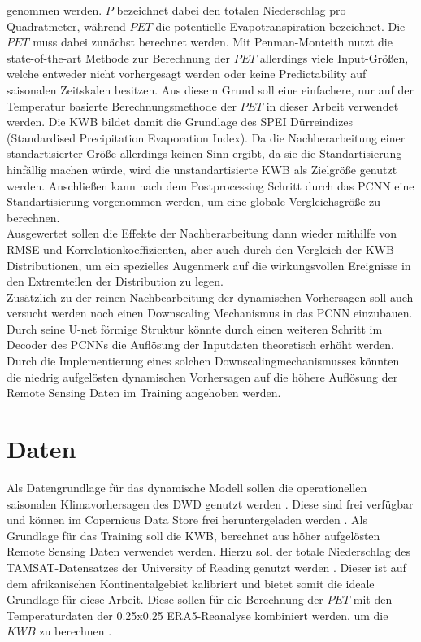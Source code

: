 \documentclass[ba-expose-lentz.tex]{subfile}
\begin{document}
genommen werden. $P$ bezeichnet dabei den totalen Niederschlag pro Quadratmeter, während $PET$ die potentielle Evapotranspiration bezeichnet.
Die $PET$ muss dabei zunächst berechnet werden.
Mit Penman-Monteith nutzt die state-of-the-art Methode zur Berechnung der $PET$ allerdings viele Input-Größen, welche entweder nicht vorhergesagt werden oder keine Predictability auf saisonalen Zeitskalen besitzen.
Aus diesem Grund soll eine einfachere, nur auf der Temperatur basierte Berechnungsmethode der $PET$ in dieser Arbeit verwendet werden.
Die KWB bildet damit die Grundlage des SPEI Dürreindizes (Standardised Precipitation Evaporation Index).
Da die Nachberarbeitung einer standartisierter Größe allerdings keinen Sinn ergibt, da sie die Standartisierung hinfällig machen würde, wird die unstandartisierte KWB als Zielgröße genutzt werden.
Anschließen kann nach dem Postprocessing Schritt durch das PCNN eine Standartisierung vorgenommen werden, um eine globale Vergleichsgröße zu berechnen. \\
Ausgewertet sollen die Effekte der Nachberarbeitung dann wieder mithilfe von RMSE und Korrelationkoeffizienten, aber auch durch den Vergleich der KWB Distributionen, um ein spezielles Augenmerk auf die wirkungsvollen Ereignisse in den Extremteilen der Distribution zu legen. \\
Zusätzlich zu der reinen Nachbearbeitung der dynamischen Vorhersagen soll auch versucht werden noch einen Downscaling Mechanismus in das PCNN einzubauen.
Durch seine U-net förmige Struktur könnte durch einen weiteren Schritt im Decoder des PCNNs die Auflösung der Inputdaten theoretisch erhöht werden.
Durch die Implementierung eines solchen Downscalingmechanismusses könnten die niedrig aufgelösten dynamischen Vorhersagen auf die höhere Auflösung der Remote Sensing Daten im Training angehoben werden.

\section{Daten}

Als Datengrundlage für das dynamische Modell sollen die operationellen saisonalen Klimavorhersagen des DWD genutzt werden \parencite{paxian_dwd_2023}.
Diese sind frei verfügbar und können im Copernicus Data Store frei heruntergeladen werden \parencite{paxian_dwd_2023}.
Als Grundlage für das Training soll die KWB, berechnet aus höher aufgelösten Remote Sensing Daten verwendet werden.
Hierzu soll der totale Niederschlag des TAMSAT-Datensatzes der University of Reading genutzt werden \parencite{maidment_tamsat_2020}.
Dieser ist auf dem afrikanischen Kontinentalgebiet kalibriert und bietet somit die ideale Grundlage für diese Arbeit.
Diese sollen für die Berechnung der $PET$ mit den Temperaturdaten der 0.25x0.25 ERA5-Reanalyse kombiniert werden, um die $KWB$ zu berechnen \parencite{soci_era5_2024}.
\end{document}
